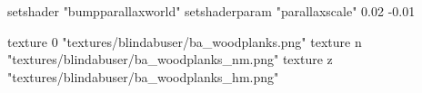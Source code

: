 	setshader "bumpparallaxworld"
	setshaderparam "parallaxscale" 0.02 -0.01

		texture 0 "textures/blindabuser/ba_woodplanks.png"
		texture n "textures/blindabuser/ba_woodplanks_nm.png"
		texture z "textures/blindabuser/ba_woodplanks_hm.png"
